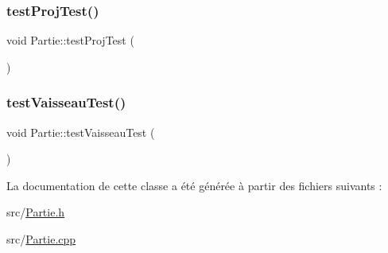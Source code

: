 \subsubsection{\texorpdfstring{test\+Proj\+Test()}{testProjTest()}}
{\footnotesize\ttfamily void Partie\+::test\+Proj\+Test (\begin{DoxyParamCaption}{ }\end{DoxyParamCaption})}

\mbox{\label{class_partie_ad9ed353f340b606840fe4053ab7b6bf3}} 
\subsubsection{\texorpdfstring{test\+Vaisseau\+Test()}{testVaisseauTest()}}
{\footnotesize\ttfamily void Partie\+::test\+Vaisseau\+Test (\begin{DoxyParamCaption}{ }\end{DoxyParamCaption})}



La documentation de cette classe a été générée à partir des fichiers suivants \+:\begin{DoxyCompactItemize}
\item 
src/\hyperlink{_partie_8h}{Partie.\+h}\item 
src/\hyperlink{_partie_8cpp}{Partie.\+cpp}\end{DoxyCompactItemize}
